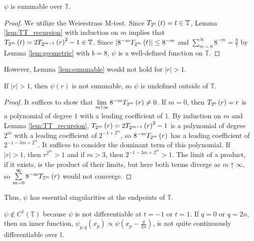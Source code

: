 \begin{lemma}[]
  \label{lem:summable}
  \leanok
  $\psi$ is summable over $\mathbb{T}$.
\end{lemma}
  
\begin{proof}
  \leanok
  We utilize the Weierstrass M-test. Since $T_{2^{0}}\left(t\right) = t \in \mathbb{T}$, Lemma \ref{lem:TT_recursion} with induction on $m$ implies that $T_{2^{m}}\left(t\right) = 2T_{2^{m - 1}}\left(r\right)^2 - 1 \in \mathbb{T}$. Since $\left|8^{-m} T_{2^{m}}\left(t\right)\right| \leq 8^{-m}$ and $\sum\limits_{m = 0}^\infty 8^{-m} = \frac{8}{7}$ by Lemma \ref{lem:geometric} with $b = 8$, $\psi$ is a well-defined function on $\mathbb{T}$.
\end{proof}
\noindent However, Lemma \ref{lem:summable} would not hold for $\left|r\right| > 1$.
\begin{lemma}[]
  \label{lem:not_summable}
If $\left|r\right| > 1$, then $\psi\left(r\right)$ is not summable, so $\psi$ is undefined outside of $\mathbb{T}$.
\end{lemma}

\begin{proof}
It suffices to show that $\lim\limits_{m \uparrow \infty} 8^{-m} T_{2^{m}}\left(r\right) \neq 0$. If $m = 0$, then $T_{2^{0}}\left(r\right) = r$ is a polynomial of degree $1$ with a leading coefficient of $1$. By induction on $m$ and Lemma \ref{lem:TT_recursion}, $T_{2^{m}}\left(r\right) = 2 T_{2^{m - 1}}\left(r\right)^2 - 1$ is a polynomial of degree $2^m$ with a leading coefficient of $2^{-1 + 2^m}$, so $8^{-m} T_{2^{m}}\left(r\right)$ has a leading coefficient of $2^{-1 - 3m + 2^m}$. It suffices to consider the dominant term of this polynomial. If $\left|r\right| > 1$, then $r^{2^m} > 1$ and if $m > 3$, then $2^{-1 - 3m + 2^m} > 1$. The limit of a product, if it exists, is the product of their limits, but here both terms diverge as $m \uparrow \infty$, so $\sum\limits_{m = 0}^\infty 8^{-m}T_{2^{m}}\left(r\right)$ would not converge.
\end{proof}

Thus, $\psi$ has essential singularities at the endpoints of $\mathbb{T}$.
\begin{proposition}[]
  \label{prop:nondifferentiable}
  $\psi \notin C^1\left(\mathbb{T}\right)$ because $\psi$ is not differentiable at $t = -1$ or $t = 1$. If $q = 0$ or $q = 2n$, then an inner function, $\psi_{p,q}\left(x_p\right) \propto \psi\left(x_p - \frac{q}{2n}\right)$, is not quite continuously differentiable over $\mathbb{I}$. 
\end{proposition}
  
